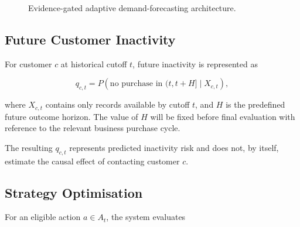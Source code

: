 \documentclass[a4paper,11pt,oneside]{book}
\theoremstyle{plain}
\theoremstyle{definition}
\theoremstyle{remark}
\begin{document}
\begin{figure}[H]
\centering
{}
\caption{Evidence-gated adaptive demand-forecasting architecture.}
\label{fig:adaptive_demand_architecture}
\end{figure}

\subsection{Future Customer Inactivity}
\label{subsec:customer_inactivity}

For customer \(c\) at historical cutoff \(t\), future inactivity is represented
as

\begin{equation}
q_{c,t}
=
P\!\left(
\text{no purchase in }(t,t+H]
\mid
X_{c,t}
\right),
\label{eq:churn}
\end{equation}

where \(X_{c,t}\) contains only records available by cutoff \(t\), and \(H\)
is the predefined future outcome horizon. The value of \(H\) will be fixed
before final evaluation with reference to the relevant business purchase cycle.

The resulting \(q_{c,t}\) represents predicted inactivity risk and does not, by
itself, estimate the causal effect of contacting customer \(c\).


\subsection{Strategy Optimisation}
\label{subsec:strategy_optimization}

For an eligible action \(a\in A_t\), the system evaluates
\end{document}
